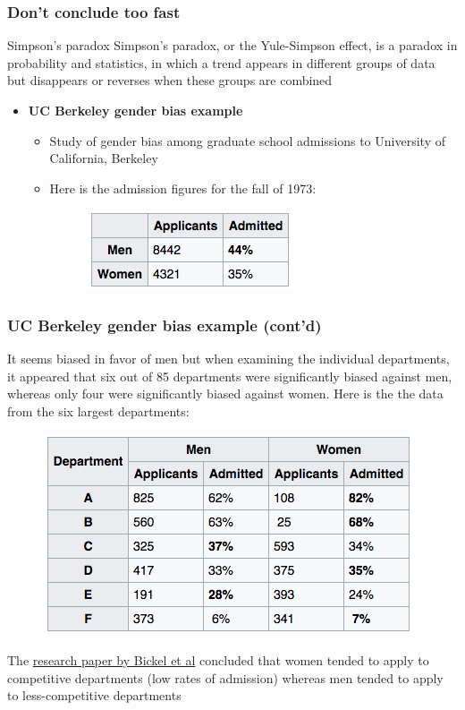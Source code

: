 \documentclass{beamer}
\begin{document}
\begin{frame}\frametitle{Don't conclude too fast}
\begin{block}{Simpson's paradox}
\justifying
Simpson's paradox, or the Yule-Simpson effect, is a paradox in probability and statistics, in which a trend appears in different groups of data but disappears or reverses when these groups are combined
\end{block}
\begin{itemize}
	\item {\bf UC Berkeley gender bias example}
	\begin{itemize}
		\item Study of gender bias among graduate school admissions to University of California, Berkeley
		\item Here is the admission figures for the fall of 1973:
		\begin{figure}[h]
			\centering
			\includegraphics[scale=0.55]{./Figures/ucb_gender1}
			\label{fig:radmission_figures}
		\end{figure}
	\end{itemize}
\end{itemize}
\end{frame}

\begin{frame}\frametitle{UC Berkeley gender bias example (cont'd)}
\justifying
It seems biased in favor of men but when examining the individual departments, it appeared that six out of 85 departments were significantly biased against men, whereas only four were significantly biased against women. Here is the the data from the six largest departments:
\begin{figure}[h]
	\centering
	\includegraphics[scale=0.5]{./Figures/ucb_gender2}
	\label{fig:radmission_figures2}
\end{figure}
The \href{http://homepage.stat.uiowa.edu/~mbognar/1030/Bickel-Berkeley.pdf}{research paper by Bickel et al} concluded that women tended to apply to competitive departments (low rates of admission) whereas men tended to apply to less-competitive departments
\end{frame}
\end{document}
